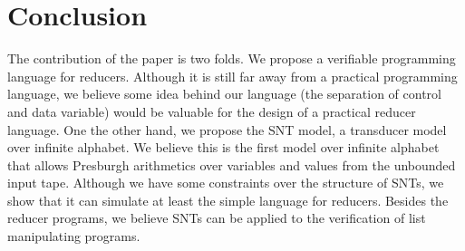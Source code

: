 	
\section{Conclusion}
\label{sec:conclusion}


The contribution of the paper is two folds. We propose a verifiable programming language for reducers. Although it is still far away from a practical programming language, we believe some idea behind our language (the separation of control and data variable) would be valuable for the design of a practical reducer language. One the other hand, we propose the SNT model, a transducer model over infinite alphabet. We believe this is the first model over infinite alphabet that allows Presburgh arithmetics over variables and values from the unbounded input tape. Although we have some constraints over the structure of SNTs, we show that it can simulate at least the simple language for reducers. Besides the reducer programs, we believe SNTs can be applied to the verification of list manipulating programs.



